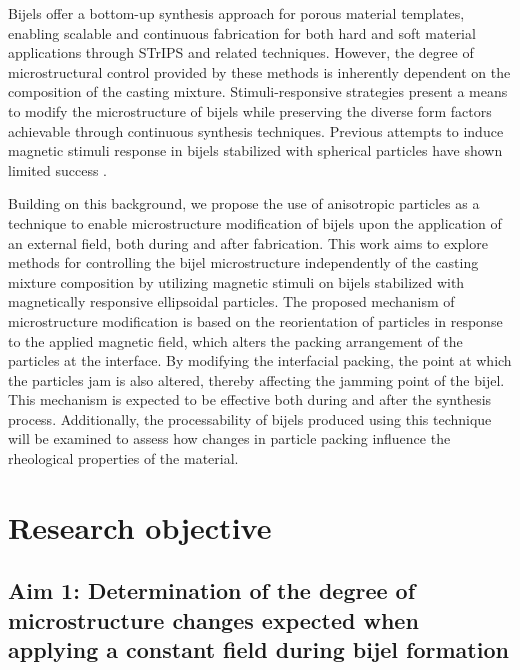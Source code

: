 Bijels offer a bottom-up synthesis approach for porous material templates, enabling scalable and continuous fabrication for both hard and soft material 
applications through STrIPS and related techniques. However, the degree of microstructural control provided by these methods is inherently dependent on 
the composition of the casting mixture. Stimuli-responsive strategies present a means to modify the microstructure of bijels while preserving the 
diverse form factors achievable through continuous synthesis techniques. Previous attempts to induce magnetic stimuli response in bijels stabilized 
with spherical particles have shown limited success \cite{kim_bijels_2010}.  

Building on this background, we propose the use of anisotropic particles as a technique to enable microstructure modification of bijels upon the application 
of an external field, both during and after fabrication. This work aims to explore methods for controlling the bijel microstructure independently of the casting 
mixture composition by utilizing magnetic stimuli on bijels stabilized with magnetically responsive ellipsoidal particles.  
The proposed mechanism of microstructure modification is based on the reorientation of particles in response to the applied magnetic field, which alters the 
packing arrangement of the particles at the interface. By modifying the interfacial packing, the point at which the particles jam is also altered, thereby 
affecting the jamming point of the bijel. This mechanism is expected to be effective both during and after the synthesis process. Additionally, the 
processability of bijels produced using this technique will be examined to assess how changes in particle packing influence the rheological properties of 
the material.  

\section{Research objective}


\subsection{Aim 1: Determination of the degree of microstructure changes expected when applying a constant field during bijel formation}
\label{section:aim1_desc}

